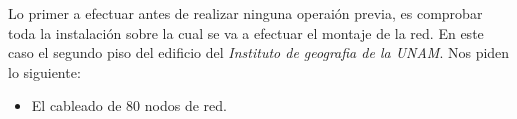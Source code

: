\documentclass[../main.tex]{subfiles}
\begin{document}
Lo primer a efectuar antes de realizar ninguna operaión previa, es
comprobar toda la instalación sobre la cual se va a efectuar el
montaje de la red. En este caso el segundo piso del edificio del
\textit{Instituto de geografia de la UNAM}. Nos piden lo siguiente:

\begin{itemize}
\item El cableado de 80 nodos de red.
\end{itemize}
\end{document}
